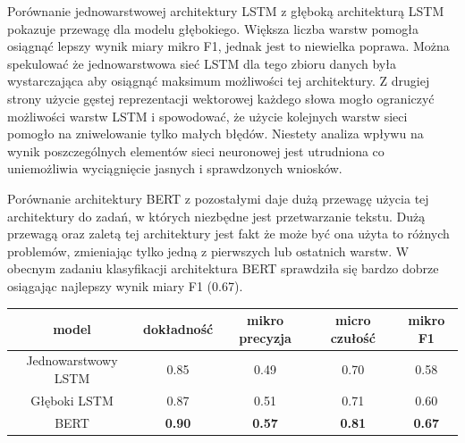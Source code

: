 Porównanie jednowarstwowej architektury LSTM  z głęboką architekturą LSTM pokazuje przewagę dla modelu głębokiego. Większa liczba warstw pomogła osiągnąć lepszy wynik miary mikro F1, jednak jest to niewielka poprawa. Można spekulować że jednowarstwowa sieć LSTM dla tego zbioru danych była wystarczająca aby osiągnąć maksimum możliwości tej architektury. Z drugiej strony użycie gęstej reprezentacji wektorowej każdego słowa mogło ograniczyć możliwości warstw LSTM i spowodować, że użycie kolejnych warstw sieci pomogło na zniwelowanie tylko małych błędów. Niestety analiza wpływu na wynik poszczególnych elementów sieci neuronowej jest utrudniona co uniemożliwia wyciągnięcie jasnych i sprawdzonych wniosków.

Porównanie architektury BERT z pozostałymi daje dużą przewagę użycia tej architektury do zadań, w których niezbędne jest przetwarzanie tekstu. Dużą przewagą oraz zaletą tej architektury jest fakt że może być ona użyta to różnych problemów, zmieniając tylko jedną z pierwszych lub ostatnich warstw. W obecnym zadaniu klasyfikacji architektura BERT sprawdziła się bardzo dobrze osiągając najlepszy wynik miary F1 (0.67).  

\begin{table}[ht]
\label{tab:tabela_results}
\centering\footnotesize%
\begin{tabular}{c c c c c}
\toprule
model & dokładność & mikro precyzja & micro czułość & \textbf{mikro F1} \\
\midrule
Jednowarstwowy LSTM & 0.85 & 0.49 & 0.70 & 0.58 \\
Głęboki LSTM & 0.87 & 0.51 & 0.71 & 0.60 \\
BERT & \textbf{0.90} & \textbf{0.57} & \textbf{0.81} & \textbf{0.67} \\
\bottomrule
\end{tabular}
\end{table}